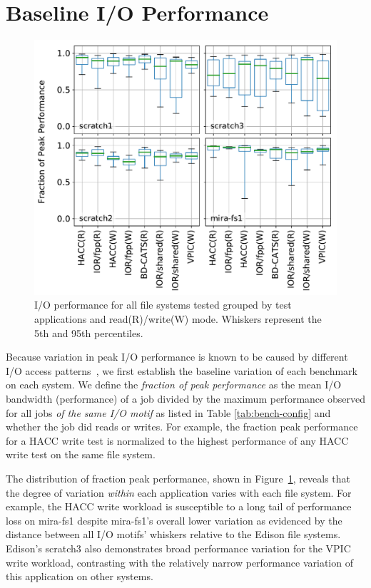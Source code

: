 \section{Baseline I/O Performance} \label{sec:results}

\begin{figure}[t]
    \centering
    \includegraphics[width=1.0\columnwidth]{figs/perf-boxplots.pdf}
    \vspace{-.25in}
    \caption{I/O performance for all file systems tested grouped by test
    applications and read(R)/write(W) mode.  Whiskers represent the 5th and 95th
    percentiles.}
    \label{fig:perf-summary-boxplots-motif}
	\vspace{-.3in}
\end{figure}

Because variation in peak I/O performance is known to be caused by different I/O access patterns~\cite{Lofstead2010,Uselton2010,Xie2012}, we first establish the baseline variation of each benchmark on each system.
We define the \emph{fraction of peak performance} as the mean I/O bandwidth (performance) of a job divided by the maximum performance observed for all jobs \emph{of the same I/O motif} as listed in Table \ref{tab:bench-config} and whether the job did reads or writes.
For example, the fraction peak performance for a HACC write test is normalized to the highest performance of any HACC write test on the same file system.

The distribution of fraction peak performance, shown in Figure~\ref{fig:perf-summary-boxplots-motif}, reveals that the degree of variation \emph{within} each application varies with each file system.
For example, the HACC write workload is susceptible to a long tail of performance loss on mira-fs1 despite mira-fs1's overall lower variation as evidenced by the distance between all I/O motifs' whiskers relative to the Edison file systems.
Edison's scratch3 also demonstrates broad performance variation for the VPIC write workload, contrasting with the relatively narrow performance variation of this application on other systems.


